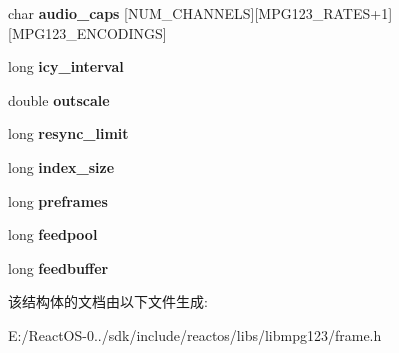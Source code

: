 \begin{DoxyCompactItemize}
char {\bfseries audio\+\_\+caps} \mbox{[}N\+U\+M\+\_\+\+C\+H\+A\+N\+N\+E\+LS\mbox{]}\mbox{[}M\+P\+G123\+\_\+\+R\+A\+T\+ES+1\mbox{]}\mbox{[}M\+P\+G123\+\_\+\+E\+N\+C\+O\+D\+I\+N\+GS\mbox{]}
\item 
\mbox{\label{structmpg123__pars__struct_a8b45c7bdc9f8ebba9aaf5905782f7829}} 
long {\bfseries icy\+\_\+interval}
\item 
\mbox{\label{structmpg123__pars__struct_a8f915a46cb8c76027b699ae9726dfdba}} 
double {\bfseries outscale}
\item 
\mbox{\label{structmpg123__pars__struct_ac56a690aa736f06d200e7bc3baa8403a}} 
long {\bfseries resync\+\_\+limit}
\item 
\mbox{\label{structmpg123__pars__struct_a111f463401ecb8b5e75d162b5c3ef7b5}} 
long {\bfseries index\+\_\+size}
\item 
\mbox{\label{structmpg123__pars__struct_a783701d8e1e36e7ab4901269c3a630cc}} 
long {\bfseries preframes}
\item 
\mbox{\label{structmpg123__pars__struct_a249c57c81397db700e6835ec4bbb5402}} 
long {\bfseries feedpool}
\item 
\mbox{\label{structmpg123__pars__struct_ace85b0ad1bf4071377612217422affcf}} 
long {\bfseries feedbuffer}
\end{DoxyCompactItemize}


该结构体的文档由以下文件生成\+:\begin{DoxyCompactItemize}
\item 
E\+:/\+React\+O\+S-\/0../sdk/include/reactos/libs/libmpg123/frame.\+h\end{DoxyCompactItemize}
